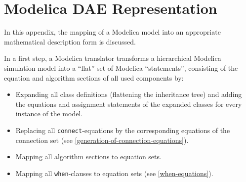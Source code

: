 \chapter{Modelica DAE Representation}\label{modelica-dae-representation}

In this appendix, the mapping of a Modelica model into an appropriate mathematical description form is discussed.

In a first step, a Modelica translator transforms a hierarchical Modelica simulation model into a ``flat'' set of Modelica ``statements'', consisting of the equation and algorithm sections of all used components by:
\begin{itemize}
\item
  Expanding all class definitions (flattening the inheritance tree) and adding the equations and assignment statements of the expanded classes for every instance of the model.
\item
  Replacing all \lstinline!connect!-equations by the corresponding equations of the connection set (see \cref{generation-of-connection-equations}).
\item
  Mapping all algorithm sections to equation sets.
\item
  Mapping all \lstinline!when!-clauses to equation sets (see \cref{when-equations}).
\end{itemize}

